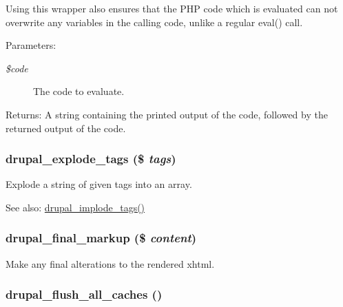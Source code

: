 Using this wrapper also ensures that the PHP code which is evaluated can not overwrite any variables in the calling code, unlike a regular eval() call.

\begin{Desc}
\item[Parameters:]
\begin{description}
\item[{\em \$code}]The code to evaluate. \end{description}
\end{Desc}
\begin{Desc}
\item[Returns:]A string containing the printed output of the code, followed by the returned output of the code. \end{Desc}
\hypertarget{common_8inc_e5bd302bab285bc819a70737f6121953}{
\subsubsection[{drupal\_\-explode\_\-tags}]{\setlength{\rightskip}{0pt plus 5cm}drupal\_\-explode\_\-tags (\$ {\em tags})}}
\label{common_8inc_e5bd302bab285bc819a70737f6121953}


Explode a string of given tags into an array.

\begin{Desc}
\item[See also:]\hyperlink{common_8inc_29df41fde25e9fcace627a628806c978}{drupal\_\-implode\_\-tags()} \end{Desc}
\hypertarget{common_8inc_2b6eb80241d0d2b40c483a4752389aa9}{
\subsubsection[{drupal\_\-final\_\-markup}]{\setlength{\rightskip}{0pt plus 5cm}drupal\_\-final\_\-markup (\$ {\em content})}}
\label{common_8inc_2b6eb80241d0d2b40c483a4752389aa9}


Make any final alterations to the rendered xhtml. \hypertarget{common_8inc_c119432cefbdbb25647944d4ca3f82f8}{
\subsubsection[{drupal\_\-flush\_\-all\_\-caches}]{\setlength{\rightskip}{0pt plus 5cm}drupal\_\-flush\_\-all\_\-caches ()}}
\label{common_8inc_c119432cefbdbb25647944d4ca3f82f8}


